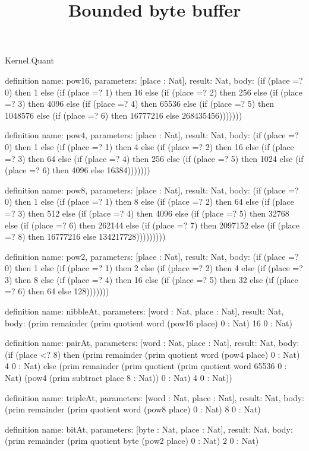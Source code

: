 \begin{lexlean}{Kernel.Quant}
\title{Bounded byte buffer}
\begin{semanticmodule}
definition{
  name: pow16,
  parameters: [place : Nat],
  result: Nat,
  body: (if (place =? 0) then 1 else (if (place =? 1) then 16 else (if (place =? 2) then 256 else (if (place =? 3) then 4096 else (if (place =? 4) then 65536 else (if (place =? 5) then 1048576 else (if (place =? 6) then 16777216 else 268435456)))))))
}

definition{
  name: pow4,
  parameters: [place : Nat],
  result: Nat,
  body: (if (place =? 0) then 1 else (if (place =? 1) then 4 else (if (place =? 2) then 16 else (if (place =? 3) then 64 else (if (place =? 4) then 256 else (if (place =? 5) then 1024 else (if (place =? 6) then 4096 else 16384)))))))
}

definition{
  name: pow8,
  parameters: [place : Nat],
  result: Nat,
  body: (if (place =? 0) then 1 else (if (place =? 1) then 8 else (if (place =? 2) then 64 else (if (place =? 3) then 512 else (if (place =? 4) then 4096 else (if (place =? 5) then 32768 else (if (place =? 6) then 262144 else (if (place =? 7) then 2097152 else (if (place =? 8) then 16777216 else 134217728)))))))))
}

definition{
  name: pow2,
  parameters: [place : Nat],
  result: Nat,
  body: (if (place =? 0) then 1 else (if (place =? 1) then 2 else (if (place =? 2) then 4 else (if (place =? 3) then 8 else (if (place =? 4) then 16 else (if (place =? 5) then 32 else (if (place =? 6) then 64 else 128)))))))
}

definition{
  name: nibbleAt,
  parameters: [word : Nat, place : Nat],
  result: Nat,
  body: (prim remainder (prim quotient word (pow16 place) 0 : Nat) 16 0 : Nat)
}

definition{
  name: pairAt,
  parameters: [word : Nat, place : Nat],
  result: Nat,
  body: (if (place <? 8) then (prim remainder (prim quotient word (pow4 place) 0 : Nat) 4 0 : Nat) else (prim remainder (prim quotient (prim quotient word 65536 0 : Nat) (pow4 (prim subtract place 8 : Nat)) 0 : Nat) 4 0 : Nat))
}

definition{
  name: tripleAt,
  parameters: [word : Nat, place : Nat],
  result: Nat,
  body: (prim remainder (prim quotient word (pow8 place) 0 : Nat) 8 0 : Nat)
}

definition{
  name: bitAt,
  parameters: [byte : Nat, place : Nat],
  result: Nat,
  body: (prim remainder (prim quotient byte (pow2 place) 0 : Nat) 2 0 : Nat)
}


\end{semanticmodule}
\end{lexlean}
